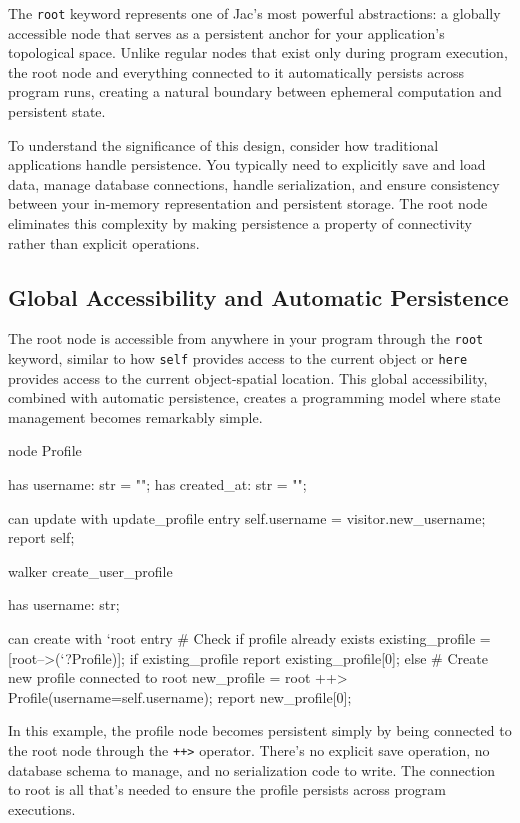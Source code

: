 The \texttt{root} keyword represents one of Jac's most powerful abstractions: a globally accessible node that serves as a persistent anchor for your application's topological space. Unlike regular nodes that exist only during program execution, the root node and everything connected to it automatically persists across program runs, creating a natural boundary between ephemeral computation and persistent state.

To understand the significance of this design, consider how traditional applications handle persistence. You typically need to explicitly save and load data, manage database connections, handle serialization, and ensure consistency between your in-memory representation and persistent storage. The root node eliminates this complexity by making persistence a property of connectivity rather than explicit operations.

\subsection{Global Accessibility and Automatic Persistence}

The root node is accessible from anywhere in your program through the \texttt{root} keyword, similar to how \texttt{self} provides access to the current object or \texttt{here} provides access to the current object-spatial location. This global accessibility, combined with automatic persistence, creates a programming model where state management becomes remarkably simple.

\begin{jacblock}
node Profile {
    has username: str = "";
    has created_at: str = "";

    can update with update_profile entry {
        self.username = visitor.new_username;
        report self;
    }
}

walker create_user_profile {
    has username: str;

    can create with `root entry {
        # Check if profile already exists
        existing_profile = [root-->(`?Profile)];
        if existing_profile {
            report existing_profile[0];
        } else {
            # Create new profile connected to root
            new_profile = root ++> Profile(username=self.username);
            report new_profile[0];
        }
    }
}
\end{jacblock}

In this example, the profile node becomes persistent simply by being connected to the root node through the \texttt{++>} operator. There's no explicit save operation, no database schema to manage, and no serialization code to write. The connection to root is all that's needed to ensure the profile persists across program executions.

